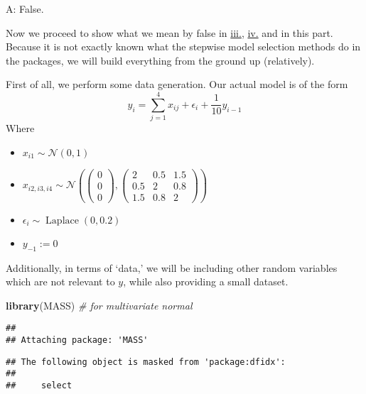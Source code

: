\documentclass[
]{article}
\newenvironment{Shaded}{\begin{snugshade}}{\end{snugshade}}
\newcommand{\CommentTok}[1]{\textcolor[rgb]{0.56,0.35,0.01}{\textit{#1}}}
\newcommand{\KeywordTok}[1]{\textcolor[rgb]{0.13,0.29,0.53}{\textbf{#1}}}
\newcommand{\NormalTok}[1]{#1}
\providecommand{\tightlist}{%
  \setlength{\itemsep}{0pt}\setlength{\parskip}{0pt}}
\begin{document}
A: False.

Now we proceed to show what we mean by false in
\protect\hyperlink{threeciii}{iii.}, \protect\hyperlink{threeciv}{iv.}
and in this part. Because it is not exactly known what the stepwise
model selection methods do in the packages, we will build everything
from the ground up (relatively).

First of all, we perform some data generation. Our actual model is of
the form \begin{equation*}
y_{i} = \sum_{j=1}^{4}x_{ij} + \epsilon_{i} + \frac{1}{10}y_{i-1}
\end{equation*} Where

\begin{itemize}
\tightlist
\item
  \(x_{i1}\sim \mathcal{N}\left(0,1\right)\)
\item
  \(x_{i2,i3,i4}\sim \mathcal{N}\left(\begin{pmatrix}0\\0\\0\end{pmatrix}, \begin{pmatrix}2& 0.5& 1.5\\0.5& 2& 0.8\\1.5& 0.8& 2\end{pmatrix}\right)\)
\item
  \(\epsilon_{i}\sim \operatorname{Laplace}\left(0, 0.2\right)\)
\item
  \(y_{-1}:=0\)
\end{itemize}

Additionally, in terms of `data,' we will be including other random
variables which are not relevant to \(y\), while also providing a small
dataset.

\begin{Shaded}
\begin{Highlighting}[]
\KeywordTok{library}\NormalTok{(MASS)  }\CommentTok{# for multivariate normal}
\end{Highlighting}
\end{Shaded}

\begin{verbatim}
## 
## Attaching package: 'MASS'
\end{verbatim}

\begin{verbatim}
## The following object is masked from 'package:dfidx':
## 
##     select
\end{verbatim}
\end{document}
